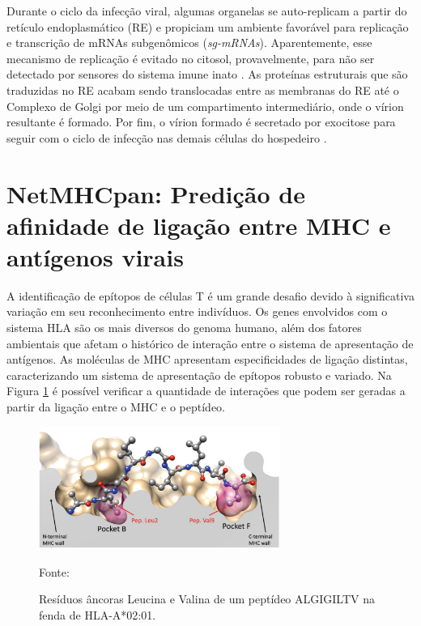 \begin{justify}
\begin{figure}
\end{figure}

\begin{figure}
\end{figure}

\vspace{10mm}

Durante o ciclo da infecção viral, algumas organelas se auto-replicam a partir do retículo endoplasmático (RE) e propiciam um ambiente favorável para replicação e transcrição de mRNAs subgenômicos (\textit{sg-mRNAs}). Aparentemente, esse mecanismo de replicação é evitado no citosol, provavelmente, para não ser detectado por sensores do sistema imune inato \cite{Vkovski:2021}. As proteínas estruturais que são traduzidas no RE acabam sendo translocadas entre as membranas do RE até o Complexo de Golgi por meio de um compartimento intermediário, onde o vírion resultante é formado.  Por fim, o vírion formado é secretado por exocitose para seguir com o ciclo de infecção nas demais células do hospedeiro \cite{Vkovski:2021, Yang:2021}.



\section{NetMHCpan: Predição de afinidade de ligação entre MHC e antígenos virais}


A identificação de epítopos de células T é um grande desafio devido à significativa variação em seu reconhecimento entre indivíduos. Os genes envolvidos com o sistema HLA são os mais diversos do genoma humano, além dos fatores ambientais que afetam o histórico de interação entre o sistema de apresentação de antígenos. As moléculas de MHC apresentam especificidades de ligação distintas, caracterizando um sistema de apresentação de epítopos robusto e variado. Na Figura \ref{fig:fig3} é possível verificar a quantidade de interações que podem ser geradas a partir da ligação entre o MHC e o peptídeo.

\begin{figure}
    \centering
    \caption{\justifying Resíduos âncoras Leucina e Valina de um peptídeo ALGIGILTV na fenda de HLA-A*02:01. }
    \includegraphics[width=0.7\textwidth]{Figuras/fig3.png}
    \label{fig:fig3}
    \begin{minipage}{0.7\textwidth} %
        \centering
        \footnotesize Fonte: 
    \end{minipage}
\end{figure}


\end{justify}
